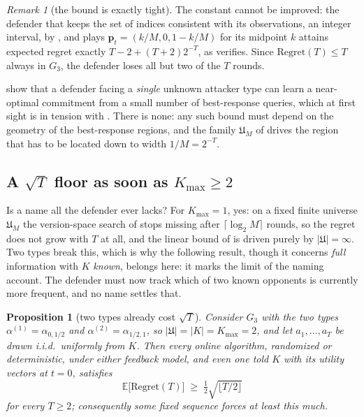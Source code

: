 \documentclass[letterpaper,9pt,twocolumn]{extarticle}
\newcommand{\pvec}{\mathbf{p}}
\newcommand{\EE}{\mathbb{E}}
\newcommand{\Kmax}{K_{\max}}
\newcommand{\Univ}{\mathfrak{U}}
\newcommand{\Regret}{\mathrm{Regret}}
\theoremstyle{plain}
\newtheorem{proposition}[theorem]{Proposition}
\theoremstyle{definition}
\theoremstyle{remark}
\newtheorem{remark}[theorem]{Remark}
\begin{document}
\begin{remark}[the bound is exactly tight]
\label{rem:tight-lb}
The constant cannot be improved: the defender that keeps the set of indices
consistent with its observations, an integer interval, by
, and plays $\pvec_t=(k/M,0,1-k/M)$ for its midpoint
$k$ attains expected regret exactly $T-2+(T+2)2^{-T}$, as
 verifies. Since $\Regret(T)\le T$ always in $G_3$, the
defender loses all but two of the $T$ rounds.
\end{remark}

 show that a defender facing a \emph{single} unknown
attacker type can learn a near-optimal commitment from a small number of
best-response queries, which at first sight is in tension with
. There is none: any such bound must depend on the
geometry of the best-response regions, and the family $\Univ_M$ of
 drives the region that has to be located down to width
$1/M=2^{-T}$.

\subsection{A $\sqrt{T}$ floor as soon as $\Kmax\ge 2$}
\label{sec:floor}

Is a name all the defender ever lacks? For $\Kmax=1$, yes: on a fixed finite
universe $\Univ_M$ the version-space search of  stops
missing after $\lceil\log_2 M\rceil$ rounds, so the regret does not grow with
$T$ at all, and the linear bound of  is driven purely by
$|\Univ|=\infty$. Two types break this, which is why the following result,
though it concerns \emph{full} information with $K$ \emph{known}, belongs
here: it marks the limit of the naming account. The defender must now track
which of two known opponents is currently more frequent, and no name settles
that.

\begin{proposition}[two types already cost $\sqrt{T}$]
\label{prop:sqrtT}
Consider $G_3$ with the two types $\alpha^{(1)}=\alpha_{0,1/2}$ and
$\alpha^{(2)}=\alpha_{1/2,1}$, so $|\Univ|=|K|=\Kmax=2$, and let
$a_1,\dots,a_T$ be drawn i.i.d.\ uniformly from $K$. Then every online
algorithm, randomized or deterministic, under either feedback model, and
even one told $K$ with its utility vectors at $t=0$, satisfies
\begin{equation}
\EE\bigl[\Regret(T)\bigr]\;\ge\;\tfrac{1}{2}\sqrt{\lfloor T/2\rfloor}
\label{eq:sqrtT}
\end{equation}
for every $T\ge 2$; consequently some fixed sequence forces at least this
much.
\end{proposition}
\end{document}
